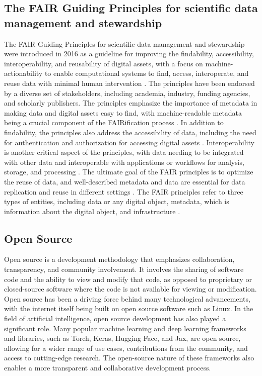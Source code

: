 \subsection{The FAIR Guiding Principles for scientific data management and stewardship }
The FAIR Guiding Principles for scientific data management and stewardship were introduced in 2016 as a guideline for improving the findability, accessibility, interoperability, and reusability of digital assets, with a focus on machine-actionability to enable computational systems to find, access, interoperate, and reuse data with minimal human intervention \cite{wilkinson2016fair}. The principles have been endorsed by a diverse set of stakeholders, including academia, industry, funding agencies, and scholarly publishers. The principles emphasize the importance of metadata in making data and digital assets easy to find, with machine-readable metadata being a crucial component of the FAIRification process \cite{wilkinson2016fair}. In addition to findability, the principles also address the accessibility of data, including the need for authentication and authorization for accessing digital assets \cite{wilkinson2016fair}. Interoperability is another critical aspect of the principles, with data needing to be integrated with other data and interoperable with applications or workflows for analysis, storage, and processing \cite{wilkinson2016fair}. The ultimate goal of the FAIR principles is to optimize the reuse of data, and well-described metadata and data are essential for data replication and reuse in different settings \cite{wilkinson2016fair}. The FAIR principles refer to three types of entities, including data or any digital object, metadata, which is information about the digital object, and infrastructure \cite{wilkinson2016fair}.


\subsection{Open Source}
Open source is a development methodology that emphasizes collaboration, transparency, and community involvement. It involves the sharing of software code and the ability to view and modify that code, as opposed to proprietary or closed-source software where the code is not available for viewing or modification. Open source has been a driving force behind many technological advancements, with the internet itself being built on open source software such as Linux.
In the field of artificial intelligence, open source development has also played a significant role. Many popular machine learning and deep learning frameworks and libraries, such as Torch, Keras, Hugging Face, and Jax, are open source, allowing for a wider range of use cases, contributions from the community, and access to cutting-edge research. The open-source nature of these frameworks also enables a more transparent and collaborative development process.


